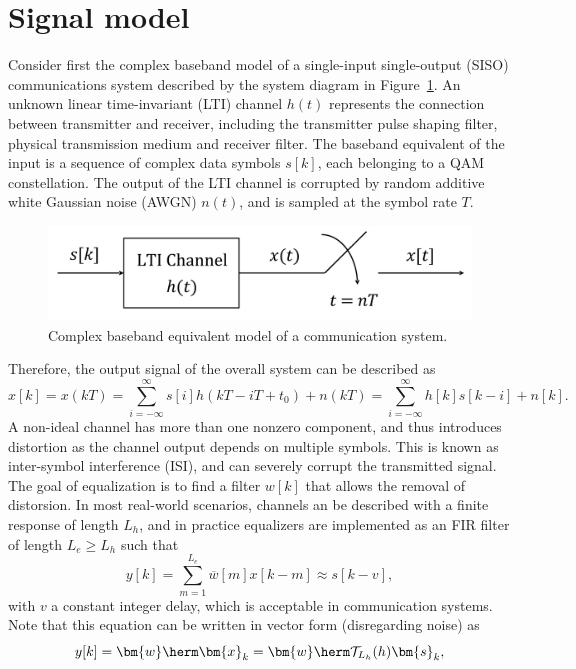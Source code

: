 \section{Signal model}
Consider first the complex baseband model of a single-input single-output (SISO) communications system described by the system diagram in Figure~\ref{fig:qamsystem}. An unknown linear time-invariant (LTI) channel $h(t)$ represents the connection between transmitter and receiver, including the transmitter pulse shaping filter, physical transmission medium and receiver filter. The baseband equivalent of the input is a sequence of complex data symbols $s[k]$, each belonging to a QAM constellation. The output of the LTI channel is corrupted by random additive white Gaussian noise (AWGN) $n(t)$, and is sampled at the symbol rate $T$. 
\begin{figure}
	\centering
	\includegraphics[width=0.8\linewidth]{./figs/bb_system.pdf}
	\caption{Complex baseband equivalent model of a communication system.}
	\label{fig:qamsystem}
\end{figure}
Therefore, the output signal of the overall system can be described as 
\begin{equation}
x[k]=x(kT)=\sum_{i=-\infty}^{\infty} s[i]h(kT-iT+t_0)+n(kT)=\sum_{i=-\infty}^{\infty} h[k]s[k-i]+n[k].
\end{equation}
A non-ideal channel has more than one nonzero component, and thus introduces distortion as the channel output depends on multiple symbols. This is known as inter-symbol interference (ISI), and can severely corrupt the transmitted signal. The goal of equalization is to find a filter $w[k]$ that allows the removal of distorsion. In most real-world scenarios, channels an be described with a finite response of length $L_h$, and in practice equalizers are implemented as an FIR filter of length $L_e\geq L_h$ such that 
\begin{equation}
y[k]=\sum_{m=1}^{L_e} \overline{w}[m]x[k-m] \approx s[k-v],
\end{equation}
with $v$ a constant integer delay, which is acceptable in communication systems. Note that this equation can be written in vector form (disregarding noise) as 
\begin{equation}
y[k]=\bm{w}\herm \bm{x}_k = \bm{w}\herm \mathcal{T}_{L_h}(h)\bm{s}_k, \label{eqn:signalmodel_siso}
\end{equation}
